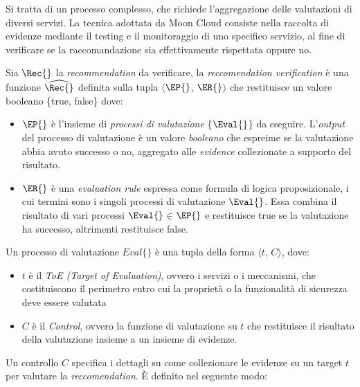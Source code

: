 \documentclass[../main.tex]{subfiles}
\begin{document}
Si tratta di un processo complesso, che richiede l'aggregazione delle valutazioni di diversi servizi. La tecnica adottata da Moon Cloud consiste nella raccolta di evidenze mediante il testing e il monitoraggio di uno specifico servizio, al fine di verificare se la raccomandazione sia effettivamente rispettata oppure no.

\begin{definition}\label{def:prop}
    Sia $\Rec{}$ la \textit{recommendation} da verificare, la \textit{reccomendation verification} è una funzione  $\widehat{\Rec{}}$  definita sulla tupla $\langle$$\EP{}$, $\ER{}$$\rangle$ che restituisce un valore booleano \{true, false\} dove:

\begin{itemize}
    \item $\EP{}$ è l'insieme di \textit{processi di valutazione} \{$\Eval{}$\} da eseguire. L'\textit{output} del processo di valutazione è un valore \textit{booleano} che espreime se la valutazione abbia avuto successo o no, aggregato alle \textit{evidence} collezionate a supporto del risultato.
        \item $\ER{}$ è una \textit{evaluation rule} espressa come formula di logica proposizionale, i cui termini sono i singoli processi di valutazione $\Eval{}$. Essa combina il risultato di vari processi $\Eval{}$$\in$$\EP{}$ e restituisce true se la valutazione ha successo, altrimenti restituisce false.
\end{itemize}
\end{definition}
\begin{definition}\label{def:eval}
Un processo di valutazione $Eval\{\}$ è una tupla della forma $\langle$$t$, $C$$\rangle$, dove:
\begin{itemize}
	\item $t$ è il \emph{ToE (Target of Evaluation)}, ovvero i servizi o i meccanismi, che costituiscono il perimetro entro cui la proprietà o la funzionalità di sicurezza deve essere valutata
	\item $C$ è il \emph{Control}, ovvero la funzione di valutazione su $t$ che restituisce il risultato della valutazione insieme a un insieme di evidenze.
\end{itemize}
\end{definition}

Un controllo $C$ specifica i dettagli su come collezionare le evidenze su un target $t$ per valutare la \textit{reccomendation}. È definito nel seguente modo:
\end{document}
